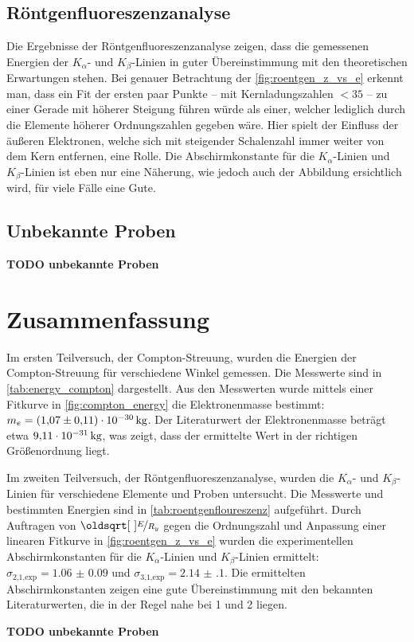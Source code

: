 \documentclass[ngerman]{scrartcl}
\begin{document}
\subsection{Röntgenfluoreszenzanalyse}
\label{sec:diskussion_roentgen}
Die Ergebnisse der Röntgenfluoreszenzanalyse zeigen, dass die gemessenen Energien der $K_{\alpha}$- und $K_{\beta}$-Linien in guter Übereinstimmung mit den theoretischen Erwartungen stehen. Bei genauer Betrachtung der \autoref{fig:roentgen_z_vs_e} erkennt man, dass ein Fit der ersten paar Punkte -- mit Kernladungszahlen $<35$ -- zu einer Gerade mit höherer Steigung führen würde als einer, welcher lediglich durch die Elemente höherer Ordnungszahlen gegeben wäre. Hier spielt der Einfluss der äußeren Elektronen, welche sich mit steigender Schalenzahl immer weiter von dem Kern entfernen, eine Rolle. Die Abschirmkonstante für die $K_{\alpha}$-Linien und $K_{\beta}$-Linien ist eben nur eine Näherung, wie jedoch auch der Abbildung ersichtlich wird, für viele Fälle eine Gute. 

\subsection{Unbekannte Proben}
\label{sec:diskussion_unbekannt}
\textbf{TODO unbekannte Proben}


\section{Zusammenfassung}
\label{sec:zusammenfassung}
Im ersten Teilversuch, der Compton-Streuung, wurden die Energien der Compton-Streuung für verschiedene Winkel gemessen. Die Messwerte sind in \autoref{tab:energy_compton} dargestellt. Aus den Messwerten wurde mittels einer Fitkurve in \autoref{fig:compton_energy} die Elektronenmasse bestimmt: $m_e = \SI{1.07(11)E-30}{\kilogram}$. Der Literaturwert der Elektronenmasse beträgt etwa $\SI{9.11E-31}{\kilogram}$, was zeigt, dass der ermittelte Wert in der richtigen Größenordnung liegt. 

Im zweiten Teilversuch, der Röntgenfluoreszenzanalyse, wurden die $K_{\alpha}$- und $K_{\beta}$-Linien für verschiedene Elemente und Proben untersucht. Die Messwerte und bestimmten Energien sind in \autoref{tab:roentgenfloureszenz} aufgeführt. Durch Auftragen von $\sqrt{\nicefrac{E}{R_y}}$ gegen die Ordnungszahl und Anpassung einer linearen Fitkurve in \autoref{fig:roentgen_z_vs_e} wurden die experimentellen Abschirmkonstanten für die $K_{\alpha}$-Linien und $K_{\beta}$-Linien ermittelt: $\sigma_{\text{2,1,exp}} = \num{1.06(9)}$ und $\sigma_{\text{3,1,exp}} = \num{2.14(10)}$. Die ermittelten Abschirmkonstanten zeigen eine gute Übereinstimmung mit den bekannten Literaturwerten, die in der Regel nahe bei 1 und 2 liegen.

\textbf{TODO unbekannte Proben}
\clearpage
\printbibliography

\listoffigures

\listoftables
\end{document}
